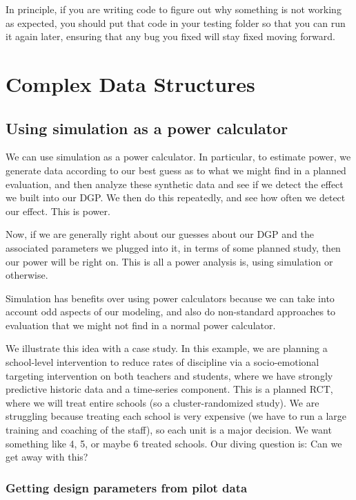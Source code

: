 \documentclass[
]{book}
\begin{document}
In principle, if you are writing code to figure out why something is not working as expected, you should put that code in your testing folder so that you can run it again later, ensuring that any bug you fixed will stay fixed moving forward.

\part{Complex Data Structures}\label{part-complex-data-structures}

\chapter{Using simulation as a power calculator}\label{sec:power}

We can use simulation as a power calculator.
In particular, to estimate power, we generate data according to our best guess as to what we might find in a planned evaluation, and then analyze these synthetic data and see if we detect the effect we built into our DGP.
We then do this repeatedly, and see how often we detect our effect.
This is power.

Now, if we are generally right about our guesses about our DGP and the associated parameters we plugged into it, in terms of some planned study, then our power will be right on.
This is all a power analysis is, using simulation or otherwise.

Simulation has benefits over using power calculators because we can take into account odd aspects of our modeling, and also do non-standard approaches to evaluation that we might not find in a normal power calculator.

We illustrate this idea with a case study.
In this example, we are planning a school-level intervention to reduce rates of discipline via a socio-emotional targeting intervention on both teachers and students, where we have strongly predictive historic data and a time-series component.
This is a planned RCT, where we will treat entire schools (so a cluster-randomized study).
We are struggling because treating each school is very expensive (we have to run a large training and coaching of the staff), so each unit is a major decision.
We want something like 4, 5, or maybe 6 treated schools.
Our diving question is: Can we get away with this?

\section{Getting design parameters from pilot data}\label{getting-design-parameters-from-pilot-data}
\end{document}

